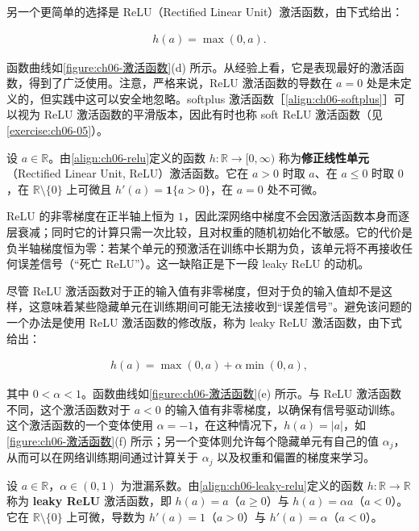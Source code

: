 \documentclass[../../main.tex]{subfiles}
\begin{document}
另一个更简单的选择是 ReLU（Rectified Linear Unit）激活函数，由下式给出：

\begin{align}
h(a)=\max(0,a).
\label{align:ch06-relu}
\end{align}

函数曲线如\cref{figure:ch06-激活函数}(d) 所示。从经验上看，它是表现最好的激活函数，得到了广泛使用。注意，严格来说，ReLU 激活函数的导数在 $a=0$ 处是未定义的，但实践中这可以安全地忽略。softplus 激活函数［\eqref{align:ch06-softplus}］可以视为 ReLU 激活函数的平滑版本，因此有时也称 soft ReLU 激活函数（见\cref{exercise:ch06-05}）。

\begin{definition}[ReLU]\label{definition:ch06-ReLU}
设 $a\in\mathbb{R}$。由\eqref{align:ch06-relu}定义的函数 $h:\mathbb{R}\to[0,\infty)$ 称为\textbf{修正线性单元}（Rectified Linear Unit, ReLU）激活函数。它在 $a>0$ 时取 $a$、在 $a\leqslant0$ 时取 $0$，在 $\mathbb{R}\setminus\{0\}$ 上可微且 $h'(a)=\mathbf{1}\{a>0\}$，在 $a=0$ 处不可微。
\end{definition}

\begin{remark}ReLU 的非零梯度在正半轴上恒为 $1$，因此深网络中梯度不会因激活函数本身而逐层衰减；同时它的计算只需一次比较，且对权重的随机初始化不敏感。它的代价是负半轴梯度恒为零：若某个单元的预激活在训练中长期为负，该单元将不再接收任何误差信号（“死亡 ReLU”）。这一缺陷正是下一段 leaky ReLU 的动机。
\end{remark}

尽管 ReLU 激活函数对于正的输入值有非零梯度，但对于负的输入值却不是这样，这意味着某些隐藏单元在训练期间可能无法接收到“误差信号”。避免该问题的一个办法是使用 ReLU 激活函数的修改版，称为 leaky ReLU 激活函数，由下式给出：

\begin{align}
h(a)=\max(0,a)+\alpha\min(0,a),
\label{align:ch06-leaky-relu}
\end{align}

其中 $0<\alpha<1$。函数曲线如\cref{figure:ch06-激活函数}(e) 所示。与 ReLU 激活函数不同，这个激活函数对于 $a<0$ 的输入值有非零梯度，以确保有信号驱动训练。这个激活函数的一个变体使用 $\alpha=-1$，在这种情况下，$h(a)=|a|$，如\cref{figure:ch06-激活函数}(f) 所示；另一个变体则允许每个隐藏单元有自己的值 $\alpha_j$，从而可以在网络训练期间通过计算关于 $\alpha_j$ 以及权重和偏置的梯度来学习。

\begin{definition}\label{definition:ch06-leaky-ReLU}
设 $a\in\mathbb{R}$，$\alpha\in(0,1)$ 为泄漏系数。由\eqref{align:ch06-leaky-relu}定义的函数 $h:\mathbb{R}\to\mathbb{R}$ 称为 \textbf{leaky ReLU} 激活函数，即 $h(a)=a$（$a\geqslant0$）与 $h(a)=\alpha a$（$a<0$）。它在 $\mathbb{R}\setminus\{0\}$ 上可微，导数为 $h'(a)=1$（$a>0$）与 $h'(a)=\alpha$（$a<0$）。
\end{definition}
\end{document}
